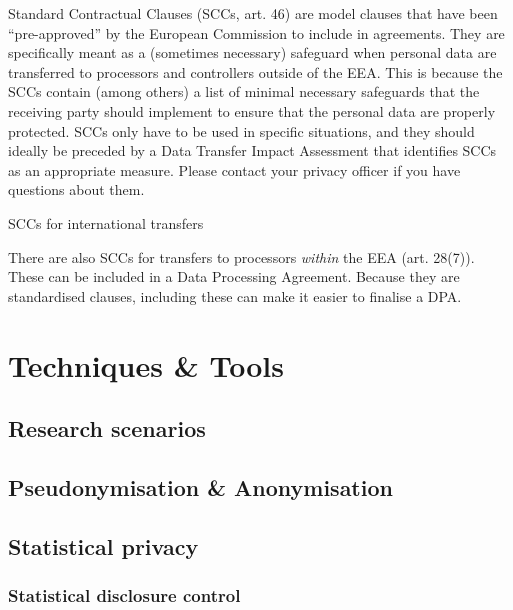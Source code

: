 \documentclass[
]{book}
\begin{document}
Standard Contractual Clauses (SCCs,
art. 46) are
model clauses that have been
``pre-approved'' by the European Commission
to include in agreements. They are specifically meant as a (sometimes necessary)
safeguard when personal data are transferred to processors and controllers
outside of the EEA. This is because the SCCs contain (among others) a list of
minimal necessary safeguards that the receiving party should implement to ensure
that the personal data are properly protected. SCCs only have to be used in
specific situations, and they should ideally be preceded by a
Data Transfer Impact Assessment that identifies SCCs as an
appropriate measure. Please contact your
privacy officer
if you have questions about them.

SCCs for international transfers

There are also SCCs for transfers to processors \emph{within} the EEA
(art. 28(7)).
These can be included in a
Data Processing Agreement. Because they
are standardised clauses, including these can make it easier to finalise a DPA.

\hypertarget{part-techniques-tools}{%
\part*{Techniques \& Tools}\label{part-techniques-tools}}

\hypertarget{research-scenarios}{%
\chapter{Research scenarios}\label{research-scenarios}}

\hypertarget{pseudonymisation-anonymisation}{%
\chapter{Pseudonymisation \& Anonymisation}\label{pseudonymisation-anonymisation}}

\hypertarget{statistical-privacy}{%
\chapter{Statistical privacy}\label{statistical-privacy}}

\hypertarget{sdc}{%
\section{Statistical disclosure control}\label{sdc}}
\end{document}
